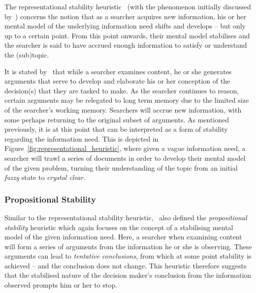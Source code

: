 The representational stability heuristic~\citep{nickles1995judgment} (with the phenomenon initially discussed by~\cite{yates1982toward}) concerns the notion that as a searcher acquires new information, his or her mental model of the underlying information need shifts and develops -- but only up to a certain point. From this point onwards, their mental model stabilises and the searcher is said to have accrued enough information to satisfy or understand the (sub)topic.

It is stated by~\cite{nickles1995judgment} that while a searcher examines content, he or she generates arguments that serve to develop and elaborate his or her conception of the decision(s) that they are tasked to make. As the searcher continues to reason, certain arguments may be relegated to long term memory due to the limited size of the searcher's working memory. Searchers will accrue new information, with some perhaps returning to the original subset of arguments. As mentioned previously, it is at this point that can be interpreted as a form of stability regarding the information need. This is depicted in Figure~\ref{fig:representational_heuristic}, where given a vague information need, a searcher will trawl a series of documents in order to develop their mental model of the given problem, turning their understanding of the topic from an initial \emph{fuzzy} state to \emph{crystal clear.}

\vspace*{-4mm}
\subsubsection{Propositional Stability}\label{sec:stopping_background:heuristics:propositional}
Similar to the representational stability heuristic,~\cite{nickles1995judgment} also defined the \emph{propositional stability} heuristic which again focuses on the concept of a stabilising mental model of the given information need. Here, a searcher when examining content will form a series of arguments from the information he or she is observing. These arguments can lead to \emph{tentative conclusions}, from which at some point stability is achieved -- and the conclusion does not change. This heuristic therefore suggests that the stabilised nature of the decision maker's conclusion from the information observed prompts him or her to stop.

\vspace*{-4mm}
